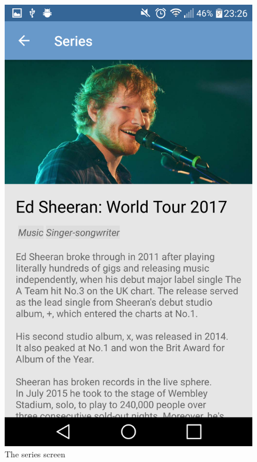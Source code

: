 \documentclass[12pt,a4paper]{bhamdissertation}
\begin{document}
\begin{figure}[!htbp]
\begin{minipage}[b]{0.4\textwidth}
    \includegraphics[width=\textwidth]{img/app_series.png}
    \caption{The series screen}
    \label{img:app_series}
  \end{minipage}
  \hspace{0.05\textwidth}
\end{figure}
\end{document}
